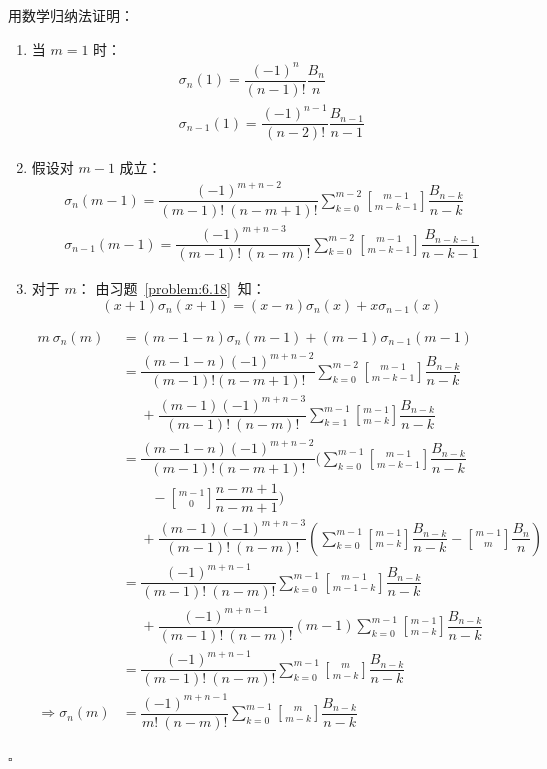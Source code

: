 用数学归纳法证明：
\begin{enumerate}
  \item[1.] 当 \( m = 1 \) 时：
    \begin{gather*}
      \sigma_{n}(1) = \dfrac{(-1)^n}{(n-1)!} \dfrac{B_n}{n} \\
      \sigma_{n-1}(1) = \dfrac{(-1)^{n-1}}{(n-2)!} \dfrac{B_{n-1}}{n-1}
    \end{gather*}
  \item[2.] 假设对 \( m-1 \) 成立：
    \begin{gather*}
      \sigma_n (m-1) = \dfrac{(-1)^{m+n-2}}{(m-1)! \ (n-m+1)!} \sum_{k=0}^{m-2} \genfrac{[}{]}{0pt}{} {m-1}{m-k-1} \dfrac{B_{n-k}}{n-k} \\
      \sigma_{n-1} (m-1) = \dfrac{(-1)^{m+n-3}}{(m-1)! \ (n-m)!} \sum_{k=0}^{m-2} \genfrac{[}{]}{0pt}{} {m-1}{m-k-1} \dfrac{B_{n-k-1}}{n-k-1}
    \end{gather*}
  \item[3.] 对于 \( m \)：
    由习题~\ref{problem:6.18}~知：
    \[
      \boxed{(x+1) \sigma_n (x+1) = (x-n) \sigma_n (x) + x \sigma_{n-1} (x)}
    \]

    \begin{align*}
      m \ \sigma_n (m) &= (m-1-n) \sigma_n (m-1) + (m-1) \sigma_{n-1} (m-1) \\
      &= \dfrac{(m-1-n) (-1)^{m+n-2}}{(m-1)! (n-m+1)!} \sum_{k=0}^{m-2} \genfrac{[}{]}{0pt}{} {m-1}{m-k-1} \dfrac{B_{n-k}}{n-k} \\
      &\phantom{=} + \dfrac{(m-1) (-1)^{m+n-3}}{(m-1)! \ (n-m)!} \sum_{k=1}^{m-1} \genfrac{[}{]}{0pt}{} {m-1}{m-k} \dfrac{B_{n-k}}{n-k} \\
      &= \dfrac{(m-1-n) (-1)^{m+n-2}}{(m-1)! (n-m+1)!} \Big( \sum_{k=0}^{m-1} \genfrac{[}{]}{0pt}{} {m-1}{m-k-1} \dfrac{B_{n-k}}{n-k} \\
      &\phantom{=+} - \genfrac{[}{]}{0pt}{} {m-1}{0} \dfrac{n-m+1}{n-m+1} \Big) \\
      &\phantom{=} + \dfrac{(m-1) (-1)^{m+n-3}}{(m-1)! \ (n-m)!} \left( \sum_{k=0}^{m-1} \genfrac{[}{]}{0pt}{} {m-1}{m-k} \dfrac{B_{n-k}}{n-k} - \genfrac{[}{]}{0pt}{} {m-1}{m} \dfrac{B_n}{n} \right) \\
      &= \dfrac{(-1)^{m+n-1}}{(m-1)! \ (n-m)!} \sum_{k=0}^{m-1} \genfrac{[}{]}{0pt}{} {m-1}{m-1-k} \dfrac{B_{n-k}}{n-k} \\
      &\phantom{=} + \dfrac{(-1)^{m+n-1}}{(m-1)! \ (n-m)!} (m-1) \sum_{k=0}^{m-1} \genfrac{[}{]}{0pt}{} {m-1}{m-k} \dfrac{B_{n-k}}{n-k} \\
      &= \dfrac{(-1)^{m+n-1}}{(m-1)! \ (n-m)!} \sum_{k=0}^{m-1} \genfrac{[}{]}{0pt}{} {m}{m-k} \dfrac{B_{n-k}}{n-k} \\
      \Rightarrow
      \sigma_n (m) &= \dfrac{(-1)^{m+n-1}}{m! \ (n-m)!} \sum_{k=0}^{m-1} \genfrac{[}{]}{0pt}{} {m}{m-k} \dfrac{B_{n-k}}{n-k}
    \end{align*}
\end{enumerate}
\hfill \( \square \)
